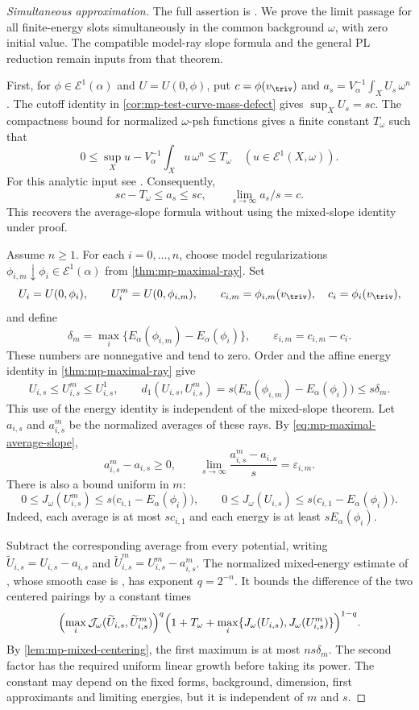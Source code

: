 \begin{proof}[Simultaneous approximation]
The full assertion is \cite[Theorem~5.3.4]{MPTropicalV2}. We prove the limit passage for all finite-energy slots simultaneously in the common background $\omega$, with zero initial value. The compatible model-ray slope formula and the general PL reduction remain inputs from that theorem.

First, for $\phi\in\mathcal E^1(\alpha)$ and $U=U(0,\phi)$, put $c=\phi(v_{\triv})$ and $a_s=V_\alpha^{-1}\int_XU_s\,\omega^n$. The cutoff identity in \cref{cor:mp-test-curve-mass-defect} gives $\sup_XU_s=sc$. The compactness bound for normalized $\omega$-psh functions gives a finite constant $T_\omega$ such that
\[
 0\leq\sup_Xu-V_\alpha^{-1}\int_Xu\,\omega^n\leq T_\omega
 \quad(u\in\mathcal E^1(X,\omega)).
\]
For this analytic input see \cite[Lemma~5.3.1 and Remark~5.3.3]{MPTropicalV2}. Consequently,
\[
       sc-T_\omega\leq a_s\leq sc,\qquad
       \lim_{s\to\infty}a_s/s=c.
\tag{60.24a}\label{eq:mp-maximal-average-slope}
\]
This recovers the average-slope formula without using the mixed-slope identity under proof.

Assume $n\geq1$. For each $i=0,\ldots,n$, choose model regularizations $\phi_{i,m}\downarrow\phi_i\in\mathcal E^1(\alpha)$ from \cref{thm:mp-maximal-ray}. Set
\[
 U_i=U(0,\phi_i),\qquad U_i^m=U(0,\phi_{i,m}),\qquad
 c_{i,m}=\phi_{i,m}(v_{\triv}),\quad c_i=\phi_i(v_{\triv}),
\]
and define
\[
 \delta_m=\max_i\{E_\alpha(\phi_{i,m})-E_\alpha(\phi_i)\},
 \qquad \varepsilon_{i,m}=c_{i,m}-c_i.
\]
These numbers are nonnegative and tend to zero. Order and the affine energy identity in \cref{thm:mp-maximal-ray} give
\[
 U_{i,s}\leq U^m_{i,s}\leq U^1_{i,s},\qquad
 d_1(U_{i,s},U^m_{i,s})
 =s\bigl(E_\alpha(\phi_{i,m})-E_\alpha(\phi_i)\bigr)
 \leq s\delta_m.
\]
This use of the energy identity is independent of the mixed-slope theorem. Let $a_{i,s}$ and $a^m_{i,s}$ be the normalized averages of these rays. By \eqref{eq:mp-maximal-average-slope},
\[
 a^m_{i,s}-a_{i,s}\geq0,\qquad
 \lim_{s\to\infty}\frac{a^m_{i,s}-a_{i,s}}s=\varepsilon_{i,m}.
\]
There is also a bound uniform in $m$:
\[
 0\leq J_\omega(U^m_{i,s})
 \leq s\bigl(c_{i,1}-E_\alpha(\phi_i)\bigr),\qquad
 0\leq J_\omega(U_{i,s})
 \leq s\bigl(c_{i,1}-E_\alpha(\phi_i)\bigr).
\]
Indeed, each average is at most $s c_{i,1}$ and each energy is at least $sE_\alpha(\phi_i)$.

Subtract the corresponding average from every potential, writing $\widetilde U_{i,s}=U_{i,s}-a_{i,s}$ and $\widetilde U^m_{i,s}=U^m_{i,s}-a^m_{i,s}$. The normalized mixed-energy estimate of \cite[Lemma~5.3.2]{MPTropicalV2}, whose smooth case is \cite[Theorem~3.6]{BJ25FiniteEnergy}, has exponent $q=2^{-n}$. It bounds the difference of the two centered pairings by a constant times
\[
 \Bigl(\max_i\mathcal J_\omega
       (\widetilde U_{i,s},\widetilde U^m_{i,s})\Bigr)^q
 \Bigl(1+T_\omega+
       \max_i\{J_\omega(U_{i,s}),J_\omega(U^m_{i,s})\}\Bigr)^{1-q}.
\]
By \cref{lem:mp-mixed-centering}, the first maximum is at most $ns\delta_m$. The second factor has the required uniform linear growth before taking its power. The constant may depend on the fixed forms, background, dimension, first approximants and limiting energies, but it is independent of $m$ and $s$.


\end{proof}
